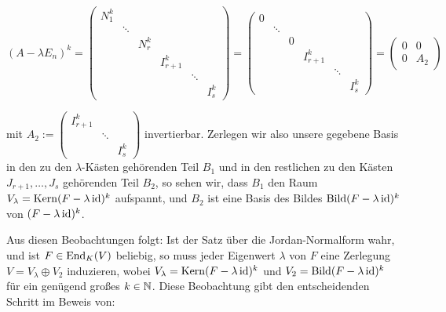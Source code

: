 \begin{bemerkung}
	\[
		(A-\lambda E_n)^k = \begin{pmatrix}
		N_1^k &        &               &         &        &  \\
		& \ddots &               &         &        &  \\
		&        & N_r^{k} &         &        &  \\
		&        &               & I_{r+1}^{k} &        &  \\
		&        &               &         & \ddots &  \\
		&        &               &         &        & I_s^{k}
		\end{pmatrix} = \begin{pmatrix}
		0 &        &               &         &        &  \\
		& \ddots &               &         &        &  \\
		&        & 0 &         &        &  \\
		&        &               & I_{r+1}^{k} &        &  \\
		&        &               &         & \ddots &  \\
		&        &               &         &        & I_s^{k}
		\end{pmatrix} = \begin{pmatrix}
			0 & 0 \\ 0 & A_2
		\end{pmatrix}
	\]
	
	mit $A_2 := \begin{pmatrix}
		I^k_{r+1} & & \\
		 & \ddots & \\
		 & & I_s^{k}
	\end{pmatrix}$ invertierbar.
	Zerlegen wir also unsere gegebene Basis in den zu den $\lambda$-Kästen gehörenden Teil $B_1$ und in den restlichen zu den Kästen $J_{r+1},\dots,J_s$ gehörenden Teil $B_2$, so sehen wir, dass $B_1$ den Raum  $V_\lambda = \operatorname{Kern}(F-\lambda \operatorname{id})^k$ aufspannt, und $B_2$ ist eine Basis des Bildes $\operatorname{Bild}(F-\lambda \operatorname{id})^k$ von $(F-\lambda \operatorname{id})^k$.
\end{bemerkung}

Aus diesen Beobachtungen folgt:
Ist der Satz über die Jordan-Normalform wahr, und ist $F \in \operatorname{End}_K(V)$ beliebig, so muss jeder Eigenwert $\lambda$ von $F$ eine Zerlegung $V = V_\lambda \oplus V_2$ induzieren, wobei $V_\lambda = \operatorname{Kern}(F - \lambda \operatorname{id})^k$ und $V_2 = \operatorname{Bild}(F - \lambda \operatorname{id})^k$ für ein genügend großes $k \in \mathbb{N}$.
Diese Beobachtung gibt den entscheidenden Schritt im Beweis von:

